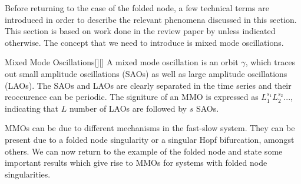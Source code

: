 \label{sec: MMO Oscilaltions} %

Before returning to the case of the folded node, a few technical terms are introduced in order to describe the relevant phenomena discussed in this section.
This section is based on work done in the review paper by \citep{MMO} unless indicated otherwise.
The concept that we need to introduce is mixed mode oscillations.
 
\begin{definition}{Mixed Mode Oscillations}[\citealp{kuehn}][\citealp{MMO}]
	A mixed mode oscillation is an orbit $\gamma$, which traces out small amplitude oscillations (SAOs) as well as large amplitude oscillations (LAOs).
	The SAOs and LAOs are clearly separated in the time series and their reoccurence can be periodic.
	The signiture of an MMO is expressed as $L_1^{s_1}L_2^{s_2}...$, indicating that $L$ number of LAOs are followed by $s$ SAOs.
\end{definition}
MMOs can be due to different mechanisms in the fast-slow system. They can be present due to a folded node singularity or a singular Hopf bifurcation, amongst others.
We can now return to the example of the folded node and state some important results which give rise to MMOs for systems with folded node singularities.

